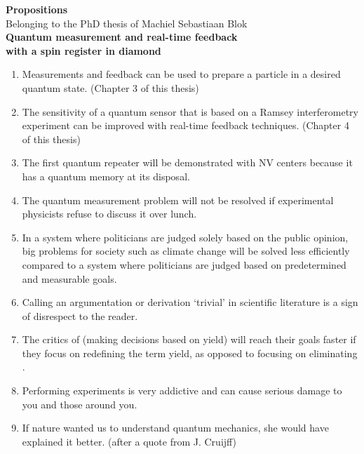 \documentclass[9pt,a5paper]{memoir}
\begin{document}
\thispagestyle{empty}
\begin{center}
\LARGE{\textbf{Propositions}}\\[11pt]
\large{Belonging to the PhD thesis of Machiel Sebastiaan Blok}\\[11pt]
\large{\textbf{Quantum measurement and real-time feedback \\
\noindent with a spin register in diamond}}\\[11pt]
\end{center}

\noindent
\begin{enumerate}

\item Measurements and feedback can be used to prepare a particle in a desired quantum state. (Chapter 3 of this thesis)

\item The sensitivity of a quantum sensor that is based on a Ramsey interferometry experiment can be improved with real-time feedback techniques. (Chapter 4 of this thesis)

\item The first quantum repeater will be demonstrated with NV centers because it has a quantum memory at its disposal.

\item The quantum measurement problem will not be resolved if experimental physicists refuse to discuss it over lunch.

\item In a system where politicians are judged solely based on the public opinion, big problems for society such as climate change will be solved less efficiently compared to a system where politicians are judged based on predetermined and measurable goals.

\item Calling an argumentation or derivation `trivial' in scientific literature is a sign of disrespect to the reader.

\item The critics of  (making decisions based on yield) will reach their goals faster if they focus on redefining the term yield, as opposed to focusing on eliminating .

\item Performing experiments is very addictive and can cause serious damage to you and those around you.

\item If nature wanted us to understand quantum mechanics, she would have explained it better. (after a quote from J. Cruijff)
\end{enumerate}
\end{document}
